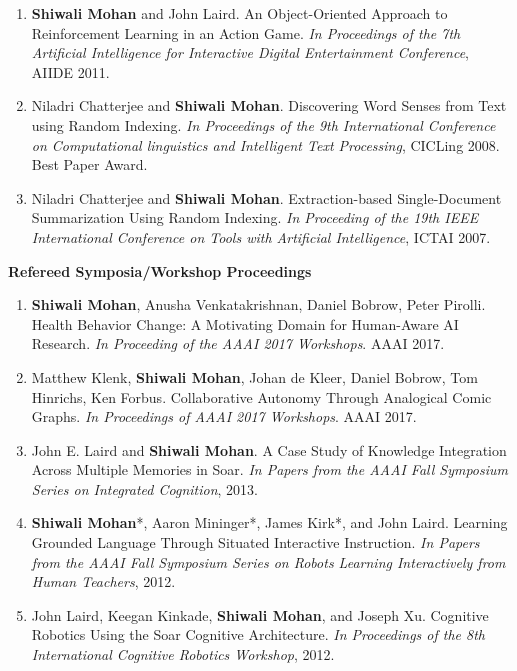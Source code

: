 \documentclass[margin,line,11pt]{res}
\begin{document}
\begin{resume}
\begin{enumerate}[label=\lbrack C\arabic*\rbrack,leftmargin=*]
  \item \textbf{Shiwali Mohan} and John Laird. An Object-Oriented Approach to Reinforcement Learning in an Action Game. \emph{In Proceedings of the 7th Artificial Intelligence for Interactive Digital Entertainment Conference}, AIIDE 2011.
  \item Niladri Chatterjee and \textbf{Shiwali Mohan}. Discovering Word Senses from Text using Random Indexing. \emph{In Proceedings of the 9th International Conference on Computational linguistics and Intelligent Text Processing}, CICLing 2008. Best Paper Award.
  \item Niladri Chatterjee and \textbf{Shiwali Mohan}. Extraction-based Single-Document Summarization Using Random Indexing. \emph{In Proceeding of the 19th IEEE International Conference on Tools with Artificial Intelligence}, ICTAI 2007.
\end{enumerate}

\textbf{Refereed Symposia/Workshop Proceedings}
\begin{enumerate}[label=\lbrack W\arabic*\rbrack:,leftmargin=*]
\item \textbf{Shiwali Mohan}, Anusha Venkatakrishnan, Daniel Bobrow, Peter Pirolli. Health Behavior Change: A Motivating Domain for Human-Aware AI Research. \emph{In Proceeding of the AAAI 2017 Workshops}. AAAI 2017.
  
\item Matthew Klenk, \textbf{Shiwali Mohan}, Johan de Kleer, Daniel Bobrow, Tom Hinrichs, Ken Forbus. Collaborative Autonomy Through Analogical Comic Graphs. \emph{In Proceedings of AAAI 2017 Workshops}. AAAI 2017.
  
\item John E. Laird and \textbf{Shiwali Mohan}. A Case Study of Knowledge Integration Across Multiple Memories in Soar. \emph{In Papers from the AAAI Fall Symposium Series on Integrated Cognition}, 2013.
  
\item \textbf{Shiwali Mohan}*, Aaron Mininger*, James Kirk*, and John Laird. Learning Grounded Language Through Situated Interactive Instruction. \emph{In Papers from the AAAI Fall Symposium Series on Robots Learning Interactively from Human Teachers}, 2012.

\item John Laird, Keegan Kinkade, \textbf{Shiwali Mohan}, and Joseph Xu. Cognitive Robotics Using the Soar Cognitive Architecture. \emph{In Proceedings of the 8th International Cognitive Robotics Workshop}, 2012.


\end{enumerate}
\end{resume}
\end{document}
